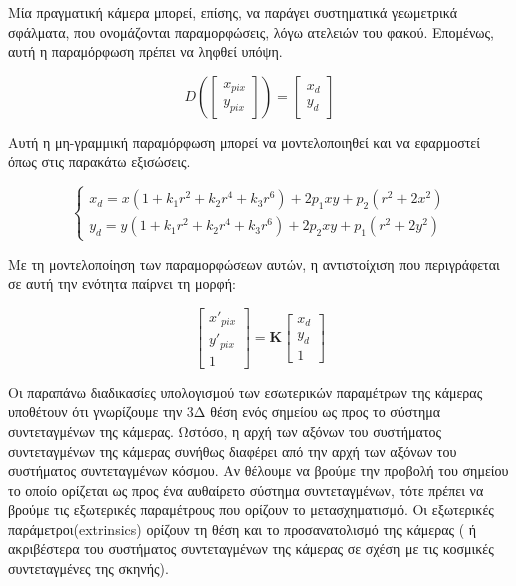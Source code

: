 Mία πραγματική κάμερα μπορεί, επίσης, να παράγει συστηματικά γεωμετρικά σφάλματα, που ονομάζονται παραμορφώσεις, λόγω ατελειών του φακού. 
Επομένως, αυτή η παραμόρφωση πρέπει να ληφθεί υπόψη.


\begin{equation}
D
\left(
\begin{bmatrix}
x_{pix}\\
y_{pix}   
\end{bmatrix}
\right )
=
\begin{bmatrix}
x_{d}\\
y_{d}   
\end{bmatrix}
\end{equation} 



Αυτή η μη-γραμμική παραμόρφωση μπορεί να μοντελοποιηθεί και να εφαρμοστεί όπως στις παρακάτω εξισώσεις. 



\begin{equation}
\begin{cases}x_{d}=x(1+k_{1}r^{2}+k_{2}r^{4}+k_{3}r^{6})+2p_{1}xy+p_{2}(r^{2}+2x^{2})\\
y_{d}=y(1+k_{1}r^{2}+k_{2}r^{4}+k_{3}r^{6})+2p_{2}xy+p_{1}(r^{2}+2y^{2})\end{cases}
\end{equation}

Με τη μοντελοποίηση των παραμορφώσεων αυτών, η αντιστοίχιση που περιγράφεται σε αυτή την ενότητα παίρνει τη μορφή:


\begin{equation}
\begin{bmatrix}
x'_{pix}\\y'_{pix}\\1
\end{bmatrix}
=
\mathbf{K}
\begin{bmatrix}
x_{d}\\
y_{d}\\
1
\end{bmatrix}
\end{equation}








Οι παραπάνω διαδικασίες υπολογισμού των εσωτερικών παραμέτρων της κάμερας υποθέτουν ότι γνωρίζουμε την 3Δ θέση ενός σημείου ως προς το σύστημα συντεταγμένων της κάμερας. Ωστόσο, η αρχή των αξόνων του συστήματος συντεταγμένων της κάμερας συνήθως διαφέρει από την αρχή των αξόνων του συστήματος συντεταγμένων κόσμου.
Αν θέλουμε να βρούμε την προβολή του σημείου το οποίο ορίζεται ως προς ένα αυθαίρετο σύστημα συντεταγμένων, τότε πρέπει να βρούμε τις εξωτερικές παραμέτρους που ορίζουν το μετασχηματισμό. Οι εξωτερικές παράμετροι(extrinsics) ορίζουν τη θέση και το προσανατολισμό της κάμερας ( ή ακριβέστερα του συστήματος συντεταγμένων της κάμερας σε σχέση με τις κοσμικές συντεταγμένες της σκηνής). 

